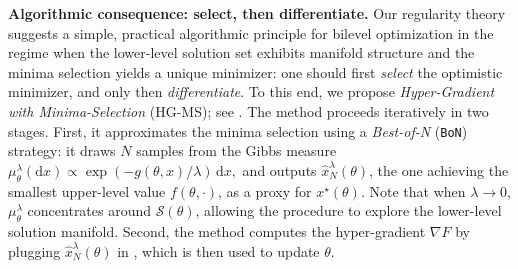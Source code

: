 \documentclass{article}
\theoremstyle{normaltheorem}
\newcommand{\hyperobjective}{F}
\newcommand{\gibbs}{\mu}
\newcommand{\gibbstheta}{\gibbs_\theta^\lambda}
\newcommand{\calS}{\mathcal{S}}
\newcommand{\BoN}{\texttt{BoN}\xspace}
\begin{document}








\textbf{Algorithmic consequence: select, then differentiate.}
Our regularity theory suggests a simple, practical algorithmic principle for bilevel optimization in the regime when the lower-level solution set exhibits manifold structure and the minima selection yields a unique minimizer:  one should first \emph{select} the optimistic minimizer, and only then \emph{differentiate}.
To this end, we propose \emph{Hyper-Gradient with Minima-Selection} (\textsc{HG-MS}); see . 
The method proceeds iteratively in two stages.
    First, it approximates the minima selection using a \emph{Best-of-N} (\BoN) strategy: it draws $N$ samples from the Gibbs measure $\gibbstheta(\mathrm{d}x)\propto \exp(-g(\theta,x)/\lambda)\,\mathrm{d}x,$ and outputs $\hat{x}_N^\lambda(\theta)$, the one achieving the smallest upper-level value $f(\theta, \cdot)$, as a proxy for $x^\star(\theta)$.
    Note that when $\lambda \to 0$, $\gibbstheta$ concentrates around $\calS(\theta)$, allowing the procedure to explore the lower-level solution manifold. 
    Second, the method computes the hyper-gradient $\nabla \hyperobjective$ by plugging $\hat{x}_N^\lambda(\theta)$ in , which is then used to update $\theta$.
\end{document}
